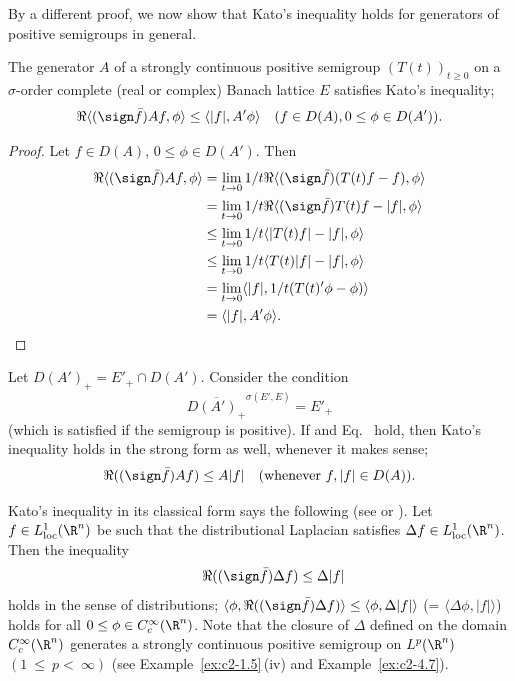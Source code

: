 By a different proof, we now show that Kato's inequality holds for generators of positive semigroups in general.
\begin{theorem}\label{thm:c2-2.4}
%
The generator $A$ of a strongly continuous positive semigroup $(T(t))_{t \geq 0}$ on a $\sigma$-order complete (real or complex) Banach lattice $E$ satisfies Kato's inequality; \ie
\begin{equation*}\label{eq:c2-K-2} %
\Re\langle(\sign \bar{f})Af,\phi \rangle \leq \langle |f|,A'\phi \rangle \quad (f \in D(A), 0 \leq \phi \in D(A')).
\end{equation*}
\end{theorem}
\begin{proof}
Let $f \in D(A)$, $0 \leq \phi \in D(A')$.
Then
\begin{align*}
\Re\langle(\sign \bar{f})Af, \phi \rangle 
	&= \lim_{t \to 0} 1/t \Re\langle(\sign \bar{f})(T(t)f - f), \phi \rangle \\
	&= \lim_{t \to 0} 1/t \Re\langle(\sign \bar{f})T(t)f - |f|, \phi \rangle \\
	&\leq \lim_{t \to 0} 1/t \langle |T(t)f| - |f|, \phi \rangle \\
	&\leq \lim_{t \to 0} 1/t \langle T(t)|f| - |f|, \phi \rangle\\
	&= \lim_{t \to 0} \langle |f|, 1/t(T(t)'\phi - \phi) \rangle\\
	&= \langle |f|, A'\phi \rangle.
\end{align*}
\end{proof}
Let $D(A')_{+} = E'_{+} \cap D(A')$. 
Consider the condition
\begin{equation}\label{eq:c2-2.9}
\overline{D(A')_{+}}^{\sigma(E',E)} = E'_{+}
\end{equation}
(which is satisfied if the semigroup is positive). 
If    and Eq.~   hold, then Kato's inequality holds in the strong form as well, whenever it makes sense; \ie
\begin{equation}\label{eq:c2-2.10}
\Re((\sign \bar{f})Af) \leq A|f| \quad \text{(whenever } f, |f| \in D(A)\text{)}.
\end{equation}
\begin{example}\label{ex:c2-2.5}
%
Kato's inequality in its classical form says the following (see \textcite{kato:1973} or \textcite[X.27]{reedsimon:1975}).
Let $f \in L^1_{\text{loc}}(\R^n)$ be such that the distributional Laplacian satisfies $\Delta f \in L^1_{\text{loc}}(\R^n)$.
Then the inequality
\begin{equation*} \label{eq:c2-K-classic} \tag*{}
\Re((\sign \bar{f})\Delta f) \leq \Delta|f| 
\end{equation*}
holds in the sense of distributions; \ie
$\langle \phi, \Re((\sign \bar{f})\Delta f) \rangle \leq \langle \phi,\Delta|f| \rangle$ (= $\langle \Delta \phi,|f| \rangle$) holds for all $0 \leq \phi \in C_{c}^{\infty}(\R^n)$.
Note that the closure of\/ $\Delta$ defined on the domain $C_{c}^{\infty}(\R^n)$ generates a strongly continuous positive semigroup on $L^p(\R^n)$ $(1~\leq~p <~\infty)$ (see Example~\ref{ex:c2-1.5}\,(iv) and Example~\ref{ex:c2-4.7}).
\end{example}
